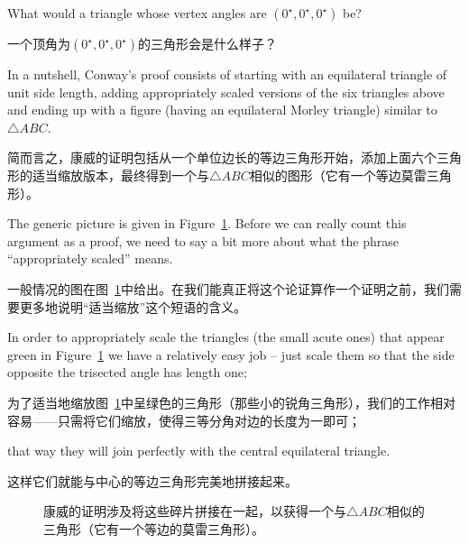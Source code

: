 \begin{exer}
What would a triangle whose vertex angles are $(0^\star, 0^\star, 0^\star)$
be?
\end{exer}

\begin{exer}
一个顶角为$(0^\star, 0^\star, 0^\star)$的三角形会是什么样子？
\end{exer}

In a nutshell, Conway's proof consists of starting with an equilateral
triangle of unit side length, adding appropriately scaled versions of the 
six triangles above and ending up with a figure (having an equilateral 
Morley triangle) similar to  ${\triangle}ABC$.

简而言之，康威的证明包括从一个单位边长的等边三角形开始，添加上面六个三角形的适当缩放版本，最终得到一个与${\triangle}ABC$相似的图形（它有一个等边莫雷三角形）。

The generic picture is
given in Figure~\ref{fig:morley_conway_puzzle}.  Before we can really
count this argument as a proof, we need to say a bit more about what
the phrase ``appropriately scaled'' means.

一般情况的图在图~\ref{fig:morley_conway_puzzle}中给出。在我们能真正将这个论证算作一个证明之前，我们需要更多地说明“适当缩放”这个短语的含义。

In order to appropriately
scale the triangles (the small acute ones) that appear green in Figure~\ref{fig:morley_conway_puzzle}
we have a relatively easy job -- just scale them so that the side
opposite the trisected angle has length one;

为了适当地缩放图~\ref{fig:morley_conway_puzzle}中呈绿色的三角形（那些小的锐角三角形），我们的工作相对容易——只需将它们缩放，使得三等分角对边的长度为一即可；

that way they will join
perfectly with the central equilateral triangle.

这样它们就能与中心的等边三角形完美地拼接起来。

\begin{figure}[!hbtp] 
\begin{center}

\end{center}
\caption[Conway's puzzle proof.]{Conway's proof involves putting 
these pieces together to obtain a triangle (with an equilateral
Morley triangle) that is similar to  %
${\triangle}ABC$.}
\caption[康威的拼图证明。]{康威的证明涉及将这些碎片拼接在一起，以获得一个与${\triangle}ABC$相似的三角形（它有一个等边的莫雷三角形）。}
\label{fig:morley_conway_puzzle}
\end{figure}
  
